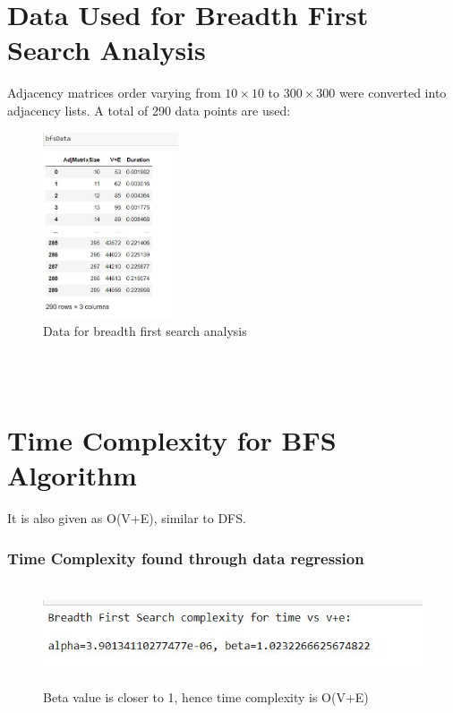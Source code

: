 \documentclass[12pt,runningheads]{article}
\begin{document}
\section{Data Used for Breadth First Search Analysis}
Adjacency matrices order varying from $10\times 10$ to $300\times 300$ were converted into adjacency lists. A total of 290 data points are used:
\begin{figure}[htp]
    \centering
    \includegraphics[width=4cm]{bfsdata.JPG}
    \caption{Data for breadth first search analysis}
    \label{fig:galaxy}
\end{figure}
\\
\\
\section{Time Complexity for BFS Algorithm}
It is also given as O(V+E), similar to DFS.
\subsubsection{Time Complexity found through data regression}
\begin{figure}[htp]
    \centering
    \includegraphics[width=12cm,height=3cm]{bfsregression.JPG}
    \caption{Beta value is closer to 1, hence time complexity is O(V+E)}
    \label{fig:galaxy}
\end{figure}
\end{document}
